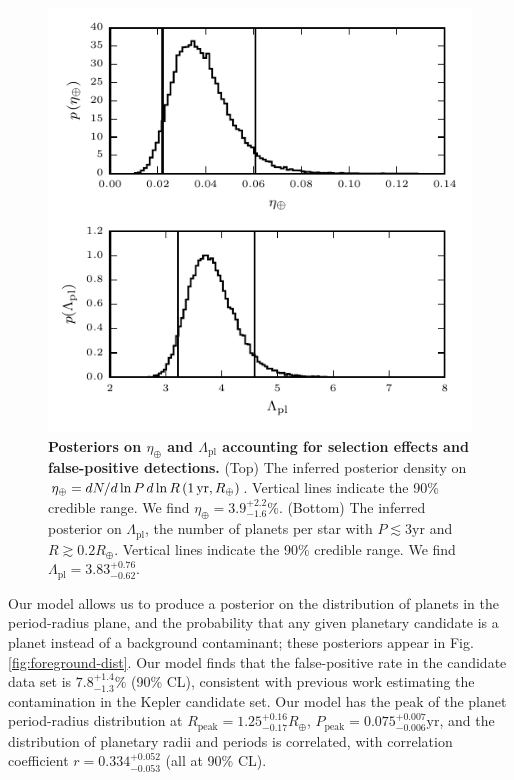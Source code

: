 \documentclass[apjl]{emulateapj}
\newcommand{\etaearth}{\eta_\oplus}
\newcommand{\Rpeak}{R_\mathrm{peak}}
\newcommand{\REarth}{R_\oplus}
\newcommand{\Rpl}{\Lambda_\mathrm{pl}}
\newcommand{\earange}{3.9_{-1.6}^{+2.2}\%}
\newcommand{\rplrange}{3.83_{-0.62}^{+0.76}}
\newcommand{\rpeakrange}{1.25_{-0.17}^{+0.16}}
\newcommand{\corrcoeffrange}{0.334_{-0.053}^{+0.052}}
\newcommand{\fposrange}{7.8_{-1.3}^{+1.4}\%}
\newcommand{\ppeakrange}{0.075_{-0.006}^{+0.007}}
\begin{document}
\begin{figure}
  \includegraphics[width=\columnwidth]{pars}
  \caption{\label{fig:eta-earth} \textbf{Posteriors on $\etaearth$ and
      $\Rpl$ accounting for selection effects and false-positive
      detections.}  (Top) The inferred posterior density on $\etaearth
    = dN/d\ln P \, d\ln R \left( 1\, \textnormal{yr}, R_\oplus
    \right)$.  Vertical lines indicate the 90\% credible range.  We
    find $\etaearth = \earange$.  (Bottom) The inferred posterior on
    $\Rpl$, the number of planets per star with $P \lesssim 3
    \mathrm{yr}$ and $R \gtrsim 0.2 \REarth$.  Vertical lines indicate
    the 90\% credible range.  We find $\Rpl = \rplrange$.}
\end{figure}

Our model allows us to produce a posterior on the distribution of
planets in the period-radius plane, and the probability that any given
planetary candidate is a planet instead of a background contaminant;
these posteriors appear in Fig. \ref{fig:foreground-dist}.  Our model
finds that the false-positive rate in the candidate data set is
$\fposrange$ (90\% CL), consistent with previous work
\citep{Fressin2013} estimating the contamination in the Kepler
candidate set.  Our model has the peak of the planet period-radius
distribution at $\Rpeak = \rpeakrange \REarth$, $P_\mathrm{peak} =
\ppeakrange \mathrm{yr}$, and the distribution of planetary radii and
periods is correlated, with correlation coefficient $r =
\corrcoeffrange$ (all at 90\% CL).
\end{document}
